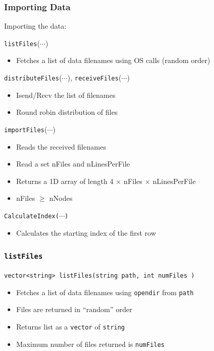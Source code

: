 \documentclass[usernames,dvipsnames]{beamer}
\begin{document}
\begin{frame}
	\frametitle{Importing Data}
	
    	\begin{block}{Importing the data:}
	    	
    		\texttt{listFiles}($\cdots$)
    		\begin{itemize}
    			\item Fetches a list of data filenames using OS calls (random order)
    		\end{itemize}
    		
    		\texttt{distributeFiles}($\cdots$), \texttt{receiveFiles}($\cdots$)
    		\begin{itemize}
    			\item Isend/Recv the list of filenames
    			\item Round robin distribution of files
    		\end{itemize}
    		
    		\texttt{importFiles}($\cdots$)
    		\begin{itemize}
    			\item Reads the received filenames
    			\item Read a set nFiles and nLinesPerFile
    			\item Returns a 1D array of length 4 $\times$ nFiles $\times$ nLinesPerFile
    			\item nFiles $\ge$ nNodes
    		\end{itemize}
    		
    		\texttt{CalculateIndex($\cdots$)}
    		    \begin{itemize}
    		        \item Calculates the starting index of the first row
    		    \end{itemize}
    	\end{block}
		
\end{frame}


\begin{frame}
	\frametitle{\texttt{listFiles}}
	
	\begin{block}{\texttt{vector<string> listFiles(string path, int numFiles )}}
    		\begin{itemize}
    			\item Fetches a list of data filenames using \texttt{opendir} from \texttt{path}
    			\item Files are returned in ``random'' order
    			\item Returns list as a \texttt{vector} of \texttt{string}
    			\item Maximum number of files returned is \texttt{numFiles}
    		\end{itemize}
	\end{block}

\end{frame}
\end{document}
